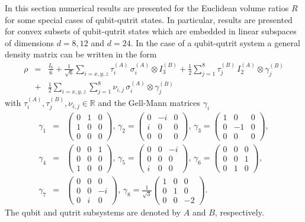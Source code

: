 \documentclass[12pt]{iopart}
\begin{document}
In this section numerical results are presented for the Euclidean volume ratios $R$ for some special cases of qubit-qutrit states.
In particular, results are presented for convex subsets of qubit-qutrit states which are embedded in linear subspaces of dimensions $d=8,12$ and $d=24$. 
In the case of a qubit-qutrit system a general density matrix can be written in the form
\begin{eqnarray}
\rho &=& \frac{I_6}{6} +  \frac{1}{\sqrt{6}}\sum_{i=x,y,z} \tau^{(A)}_i \,\sigma_i^{(A)} \otimes I^{(B)}_3 + \frac{1}{2}\sum_{j=1}^8 \tau^{(B)}_j \,I^{(A)}_2 \otimes \gamma^{(B)}_j 
  \nonumber\\
 &+&
 \frac{1}{2}\sum_{i=x,y,z} \sum_{j=1}^{8} \nu_{i,j} \,\sigma_i^{(A)} \otimes \gamma^{(B)}_j
\label{qubitqutrit}
\end{eqnarray}
with $\tau^{(A)}_i,\tau^{(B)}_j,\nu_{i,j}\in \mathbb{R}$ and the Gell-Mann matrices $\gamma_i$
\begin{eqnarray}
 \gamma_1 &=& \begin{pmatrix} 0 & 1 & 0 \\ 1 & 0 & 0 \\ 0 & 0 & 0 \end{pmatrix}, \, \gamma_2 = \begin{pmatrix} 0 & -i & 0 \\ i & 0 & 0 \\ 0 & 0 & 0 \end{pmatrix}, \,
 \gamma_3 = \begin{pmatrix} 1 & 0 & 0 \\ 0 & -1 & 0 \\ 0 & 0 & 0 \end{pmatrix}, \nonumber \\
\gamma_4 &=& \begin{pmatrix} 0 & 0 & 1 \\ 0 & 0 & 0 \\ 1 & 0 & 0 \end{pmatrix}, \, \gamma_5 = \begin{pmatrix} 0 & 0 & -i \\ 0 & 0 & 0 \\ i & 0 & 0 \end{pmatrix}, \,
\gamma_6=\begin{pmatrix} 0 & 0 & 0 \\ 0 & 0 & 1 \\ 0 & 1 & 0 \end{pmatrix}, \nonumber \\
\gamma_7 &=& \begin{pmatrix} 0 & 0 & 0 \\ 0 & 0 & -i \\ 0 & i & 0 \end{pmatrix}, \, \gamma_8= \frac{1}{\sqrt{3}} \begin{pmatrix} 1 & 0 & 0 \\ 0 & 1 & 0 \\ 0 & 0 & -2 \end{pmatrix}.
\label{Gell-Mann}
\end{eqnarray}
The qubit and qutrit subsystems are denoted by $A$ and $B$, respectively.
\end{document}
